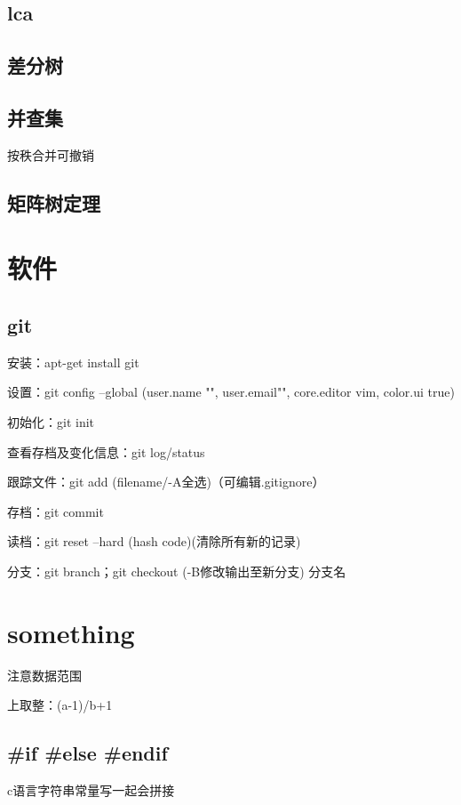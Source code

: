 \documentclass[cn,hazy,blue,screen,14pt]{template}
\begin{document}
\subsection{lca}
\subsection{差分树}

\subsection{并查集}

按秩合并可撤销
\subsection{矩阵树定理}
\newpage

\section{软件}

\subsection{git}

安装：apt-get install git

设置：git config --global (user.name "", user.email"", core.editor vim, color.ui true)

初始化：git init

查看存档及变化信息：git log/status

跟踪文件：git add (filename/-A全选)（可编辑.gitignore）

存档：git commit

读档：git reset --hard (hash code)(清除所有新的记录)

分支：git branch；git checkout (-B修改输出至新分支) 分支名 


\newpage

\section{something}

注意数据范围

上取整：(a-1)/b+1



\subsection{\#if \#else \#endif}
c语言字符串常量写一起会拼接
\end{document}
